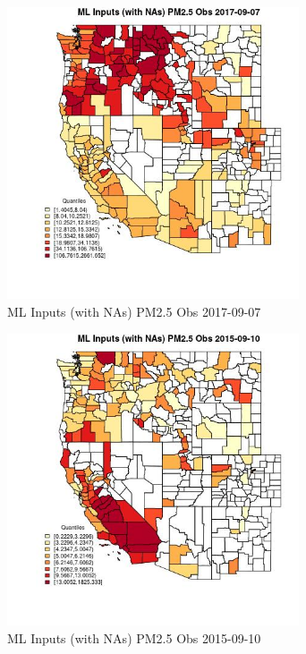 \begin{figure} 
\centering  
\includegraphics[width=0.77\textwidth]{Code_Outputs/Report_ML_input_PM25_Step4_part_e_de_duplicated_aveswNAs_CountyPM25_ObsMean2017-09-07_2017-09-07.jpg} 
\caption{\label{fig:Report_ML_input_PM25_Step4_part_e_de_duplicated_aveswNAsCountyPM25_ObsMean2017-09-07_2017-09-07}ML Inputs (with NAs) PM2.5 Obs 2017-09-07} 
\end{figure} 
 

\begin{figure} 
\centering  
\includegraphics[width=0.77\textwidth]{Code_Outputs/Report_ML_input_PM25_Step4_part_e_de_duplicated_aveswNAs_CountyPM25_ObsMean2015-09-10_2015-09-10.jpg} 
\caption{\label{fig:Report_ML_input_PM25_Step4_part_e_de_duplicated_aveswNAsCountyPM25_ObsMean2015-09-10_2015-09-10}ML Inputs (with NAs) PM2.5 Obs 2015-09-10} 
\end{figure} 
 

